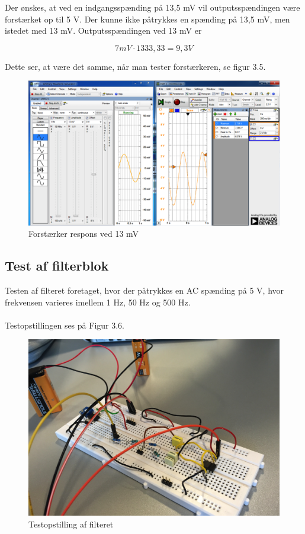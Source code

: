 Der ønskes, at ved en indgangsspænding på 13,5 mV vil outputsspændingen være forstærket op til 5 V. Der kunne ikke påtrykkes en spænding på 13,5 mV, men istedet med 13 mV. Outputsspændingen ved 13 mV er 

\begin{equation}
	7 mV \cdot 1333,33 = 9,3 V
\end{equation} 

Dette ser, at være det samme, når man tester forstærkeren, se figur 3.5. 

\begin{figure}[H]
	\centering
	\includegraphics[width=1\textwidth]{Figurer/Snip20151202_21}
	\caption{Forstærker respons ved 13 mV}
\end{figure}


\subsection{Test af filterblok}
Testen af filteret foretaget, hvor der påtrykkes en AC spænding på 5 V, hvor frekvensen varieres imellem 1 Hz, 50 Hz og 500 Hz. \\ \\

Testopstillingen ses på Figur 3.6.  

\begin{figure}[H]
	\centering
	\includegraphics[width=1\textwidth]{Figurer/Snip20151202_22}
	\caption{Testopstilling af filteret}
	\label{fig:Filter}
\end{figure}


